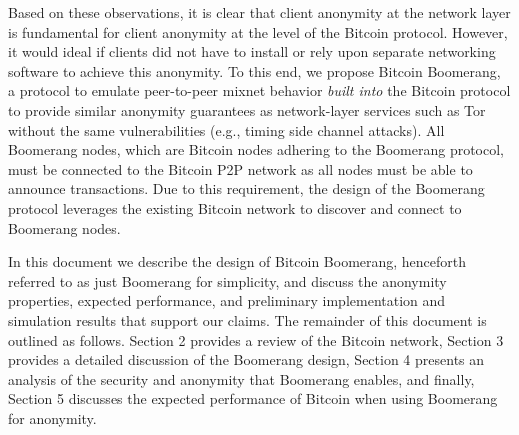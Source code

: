 Based on these observations, it is clear that client anonymity at the network layer is fundamental for client anonymity at the level of the Bitcoin protocol. However, it would ideal if clients did not have to install or rely upon separate networking software to achieve this anonymity. To this end, we propose Bitcoin Boomerang, a protocol to emulate peer-to-peer mixnet behavior \emph{built into} the Bitcoin protocol to provide similar anonymity guarantees as network-layer services such as Tor without the same vulnerabilities (e.g., timing side channel attacks). All Boomerang nodes, which are Bitcoin nodes adhering to the Boomerang protocol, must be connected to the Bitcoin P2P network as all nodes must be able to announce transactions. Due to this requirement, the design of the Boomerang protocol leverages the existing Bitcoin network to discover and connect to Boomerang nodes.

In this document we describe the design of Bitcoin Boomerang, henceforth referred to as just Boomerang for simplicity, and discuss the anonymity properties, expected performance, and preliminary implementation and simulation results that support our claims. The remainder of this document is outlined as follows. Section 2 provides a review of the Bitcoin network, Section 3 provides a detailed discussion of the Boomerang design, Section 4 presents an analysis of the security and anonymity that Boomerang enables, and finally, Section 5 discusses the expected performance of Bitcoin when using Boomerang for anonymity. 



